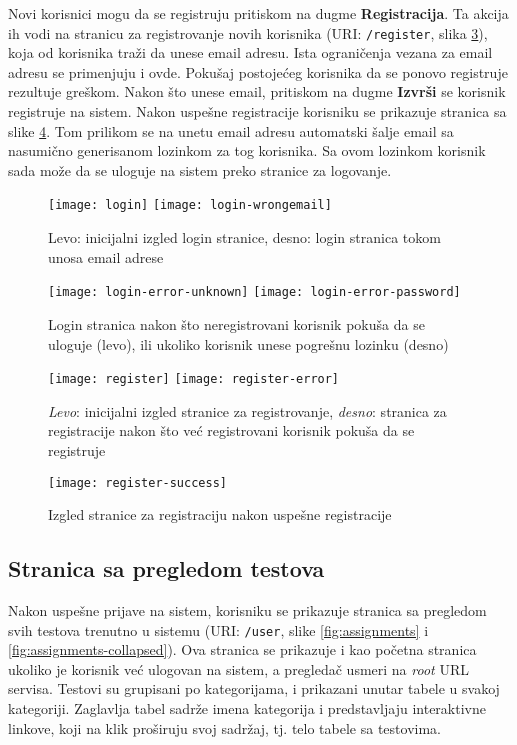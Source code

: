 Novi korisnici mogu da se registruju pritiskom na dugme \textbf{Registracija}. Ta akcija ih vodi na stranicu za registrovanje novih korisnika (URI: \texttt{/register}, slika \ref{fig:register}), koja od korisnika traži da unese email adresu. Ista ograničenja vezana za email adresu se primenjuju i ovde. Pokušaj postojećeg korisnika da se ponovo registruje rezultuje greškom. Nakon što unese email, pritiskom na dugme \textbf{Izvrši} se korisnik registruje na sistem. Nakon uspešne registracije korisniku se prikazuje stranica sa slike \ref{fig:register-success}. Tom prilikom se na unetu email adresu automatski šalje email sa nasumično generisanom lozinkom za tog korisnika. Sa ovom lozinkom korisnik sada može da se uloguje na sistem preko stranice za logovanje.
\begin{figure}[p]
\texttt{[image: login]}
\texttt{[image: login-wrongemail]}
\caption{Levo: inicijalni izgled login stranice, desno: login stranica tokom unosa email adrese}
\label{fig:login}
\end{figure}
\begin{figure}[p]
\texttt{[image: login-error-unknown]}
\texttt{[image: login-error-password]}
\caption{Login stranica nakon što neregistrovani korisnik pokuša da se uloguje (levo), ili ukoliko korisnik unese pogrešnu lozinku (desno)}
\label{fig:login-error}
\end{figure}
\begin{figure}[p]
\texttt{[image: register]}
\texttt{[image: register-error]}
\caption{\textit{Levo}: inicijalni izgled stranice za registrovanje, \textit{desno}: stranica za registracije nakon što već registrovani korisnik pokuša da se registruje}
\label{fig:register}
\end{figure}
\begin{figure}[h]
\texttt{[image: register-success]}
\caption{Izgled stranice za registraciju nakon uspešne registracije}
\label{fig:register-success}
\end{figure}

\subsection{Stranica sa pregledom testova}
Nakon uspešne prijave na sistem, korisniku se prikazuje stranica sa pregledom svih testova trenutno u sistemu (URI: \texttt{/user}, slike \ref{fig:assignments} i \ref{fig:assignments-collapsed}). Ova stranica se prikazuje i kao početna stranica ukoliko je korisnik već ulogovan na sistem, a pregledač usmeri na \textit{root} URL servisa. Testovi su grupisani po kategorijama, i prikazani unutar tabele u svakoj kategoriji. Zaglavlja tabel sadrže imena kategorija i predstavljaju interaktivne linkove, koji na klik proširuju svoj sadržaj, tj. telo tabele sa testovima.


